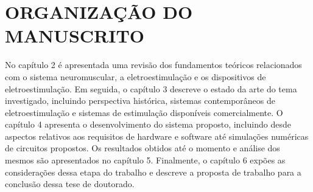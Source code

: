 \section{ORGANIZAÇÃO DO MANUSCRITO}
No capítulo 2 é apresentada uma revisão dos fundamentos teóricos relacionados com o sistema neuromuscular, a eletroestimulação e os dispositivos de eletroestimulação. Em seguida, o capítulo 3 descreve o estado da arte do tema investigado, incluindo perspectiva histórica, sistemas contemporâneos de eletroestimulação e sistemas de estimulação disponíveis comercialmente. O capítulo 4 apresenta o desenvolvimento do sistema proposto, incluindo desde aspectos relativos aos requisitos de hardware e software até simulações numéricas de circuitos propostos. Os resultados obtidos até o momento e análise dos mesmos são apresentados no capítulo 5. Finalmente, o capítulo 6 expões as considerações dessa etapa do trabalho e descreve a proposta de trabalho para a conclusão dessa tese de doutorado.